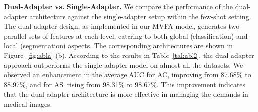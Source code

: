 \begin{table}[t]
\centering
\caption{Ablation studies of the architecture of dual-adapter against single-adapter in MVFA. The AUCs (in \%) for classification (AC) and segmentation (AS) under the few-shot setting (K=4) are reported, with the best result marked in bold.}
\label{tal:abl2}
\small
{}
\end{table}

\noindent\textbf{Dual-Adapter vs. Single-Adapter.} We compare the performance of the dual-adapter architecture against the single-adapter setup within the few-shot setting. The dual-adapter design, as implemented in our MVFA model, generates two parallel sets of features at each level, catering to both global (classification) and local (segmentation) aspects. The corresponding architectures are shown in Figure~\ref{fig:abla} (b). According to the results in Table~\ref{tal:abl2}, the dual-adapter approach outperforms the single-adapter model on almost all the datasets. We observed an enhancement in the average AUC for AC, improving from 87.68\% to 88.97\%, and for AS, rising from 98.31\% to 98.67\%. This improvement indicates that the dual-adapter architecture is more effective in managing the demands in medical images.

